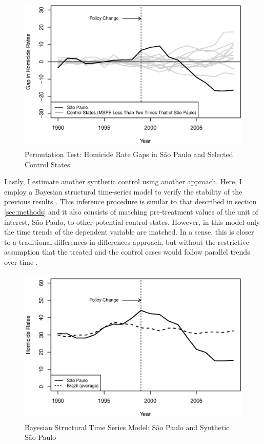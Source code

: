 \begin{figure}[H]
    \centering
    \includegraphics[height=7.5cm]{images/low-mspe.eps}
    \caption{Permutation Test: Homicide Rate Gaps in São Paulo and Selected Control States}
    \label{fig:figure7}
\end{figure}

Lastly, I estimate another synthetic control using another approach. Here, I employ a Bayesian structural time-series model to verify the stability of the previous results \citep{brodersen2015inferring}. This inference procedure is similar to that described in section \ref{sec:methods} and it also consists of matching pre-treatment values of the unit of interest, São Paulo, to other potential control states. However, in this model only the time trends of the dependent variable are matched. In a sense, this is closer to a traditional differences-in-differences approach, but without the restrictive assumption that the treated and the control cases would follow parallel trends over time \citep[494]{abadie2010}.  

\begin{figure}[H]
    \centering
    \includegraphics[height=7.5cm]{images/causal-impact.eps}
    \caption{Bayesian Structural Time Series Model: São Paulo and Synthetic São Paulo}
    \label{fig:figure8}
\end{figure}

